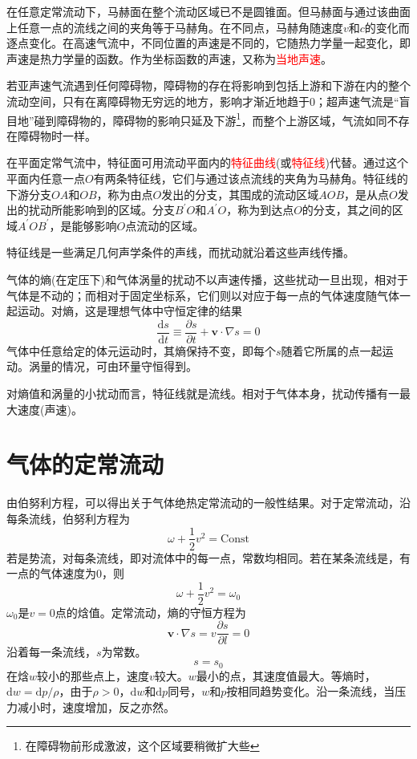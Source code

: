 \documentclass[12pt,a4paper]{article}
\renewcommand{\vec}[1]{\boldsymbol{#1}}
\newcommand{\dif}{\mathrm{d}}
\begin{document}
在任意定常流动下，马赫面在整个流动区域已不是圆锥面。但马赫面与通过该曲面上任意一点的流线之间的夹角等于马赫角。在不同点，马赫角随速度$v$和$c$的变化而逐点变化。在高速气流中，不同位置的声速是不同的，它随热力学量一起变化，即声速是热力学量的函数。作为坐标函数的声速，又称为\textcolor{red}{当地声速}。

若亚声速气流遇到任何障碍物，障碍物的存在将影响到包括上游和下游在内的整个流动空间，只有在离障碍物无穷远的地方，影响才渐近地趋于$0$；超声速气流是“盲目地”碰到障碍物的，障碍物的影响只延及下游\footnote{在障碍物前形成激波，这个区域要稍微扩大些}，而整个上游区域，气流如同不存在障碍物时一样。

在平面定常气流中，特征面可用流动平面内的\textcolor{red}{特征曲线}(或\textcolor{red}{特征线})代替。通过这个平面内任意一点$O$有两条特征线，它们与通过该点流线的夹角为马赫角。特征线的下游分支$OA$和$OB$，称为由点$O$发出的分支，其围成的流动区域$AOB$，是从点$O$发出的扰动所能影响到的区域。分支$B^{\prime}O$和$A^{\prime}O$，称为到达点$O$的分支，其之间的区域$A^{\prime}OB^{\prime}$，是能够影响$O$点流动的区域。

特征线是一些满足几何声学条件的声线，而扰动就沿着这些声线传播。

气体的熵(在定压下)和气体涡量的扰动不以声速传播，这些扰动一旦出现，相对于气体是不动的；而相对于固定坐标系，它们则以对应于每一点的气体速度随气体一起运动。对熵，这是理想气体中守恒定律的结果
\begin{equation}
\frac{\dif s}{\dif t} \equiv \frac{\partial s}{\partial t} +\vec{v}\cdot \nabla s = 0
\end{equation}
气体中任意给定的体元运动时，其熵保持不变，即每个$s$随着它所属的点一起运动。涡量的情况，可由环量守恒得到。

对熵值和涡量的小扰动而言，特征线就是流线。相对于气体本身，扰动传播有一最大速度(声速)。

\section{气体的定常流动}
由伯努利方程，可以得出关于气体绝热定常流动的一般性结果。对于定常流动，沿每条流线，伯努利方程为
\begin{equation}
\omega + \frac{1}{2} v^2 = \text{Const}
\end{equation}
若是势流，对每条流线，即对流体中的每一点，常数均相同。若在某条流线是，有一点的气体速度为$0$，则
\begin{equation}
\omega + \frac{1}{2} v^2 = \omega_0
\end{equation}
$\omega_0$是$v = 0$点的焓值。定常流动，熵的守恒方程为
\begin{equation*}
\vec{v} \cdot \nabla s = v \dfrac{\partial s}{\partial l} = 0
\end{equation*}
沿着每一条流线，$s$为常数。
\begin{equation*}
s  = s_0
\end{equation*}
在焓$w$较小的那些点上，速度$v$较大。$w$最小的点，其速度值最大。等熵时，$\dif w = \dif p/\rho$，由于$\rho > 0$，$\dif w$和$\dif p$同号，$w$和$p$按相同趋势变化。沿一条流线，当压力减小时，速度增加，反之亦然。
\end{document}
